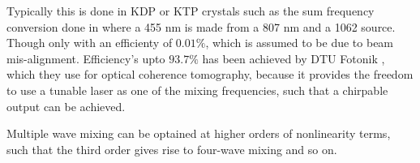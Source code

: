 Typically this is done in KDP or KTP crystals such as the sum frequency conversion
done in \cite{sumFreq} where a 455 nm is made from a 807 nm and a 1062 source. Though only with an efficienty of $0.01\%$, which is assumed to be due to beam mis-alignment. Efficiency's upto $93.7\%$ has been achieved by DTU Fotonik \cite{DTU}, which they use for optical coherence tomography, because it provides the freedom to use a tunable laser as one of the mixing frequencies, such that a chirpable output can be achieved.

Multiple wave mixing can be optained at higher orders of nonlinearity terms, such
that the third order gives rise to four-wave mixing and so on.



